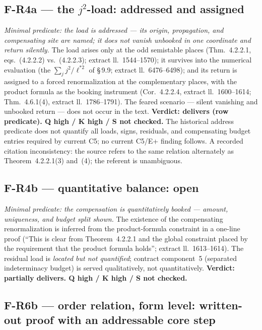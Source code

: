 \documentclass[11pt,a4paper]{article}
\begin{document}
\subsection{F-R4a --- the \texorpdfstring{$j^2$}{j\texttwosuperior}-load: addressed and assigned}\label{sec:r4a}

\emph{Minimal predicate: the load is addressed --- its origin, propagation,
and compensating site are named; it does not vanish unbooked in one
coordinate and return silently.} The load arises only at the odd semistable
places (Thm.~4.2.2.1, eqs.~(4.2.2.2) vs.~(4.2.2.3); extract ll.~1544--1570);
it survives into the numerical evaluation (the $\sum_j j^2/\ell^{*2}$ of
\S\,9.9; extract ll.~6476--6498); and its return is assigned to a forced
renormalization at the complementary places, with the product formula as the
booking instrument (Cor.~4.2.2.4, extract ll.~1600--1614; Thm.~4.6.1(4),
extract ll.~1786--1791). The feared scenario --- silent vanishing and
unbooked return --- does not occur in the text.
\textbf{Verdict: delivers (row predicate). Q high / K high / S not checked.}
The historical address predicate does not quantify all loads, signs,
residuals, and compensating budget entries required by current C5;
no current C5/E+ finding follows. A recorded citation inconsistency: the source refers to the same relation
alternately as Theorem~4.2.2.1(3) and~(4); the referent is unambiguous.

\subsection{F-R4b --- quantitative balance: open}\label{sec:r4b}

\emph{Minimal predicate: the compensation is quantitatively booked ---
amount, uniqueness, and budget split shown.} The existence of the compensating
renormalization is inferred from the product-formula constraint in a one-line
proof (``This is clear from Theorem~4.2.2.1 and the global constraint placed
by the requirement that the product formula holds''; extract ll.~1613--1614).
The residual load is \emph{located but not quantified}; contract component~5
(separated indeterminacy budget) is served qualitatively, not quantitatively.
\textbf{Verdict: partially delivers. Q high / K high / S not checked.}

\subsection{F-R6b --- order relation, form level: written-out proof with an
addressable core step}\label{sec:r6f}
\end{document}
